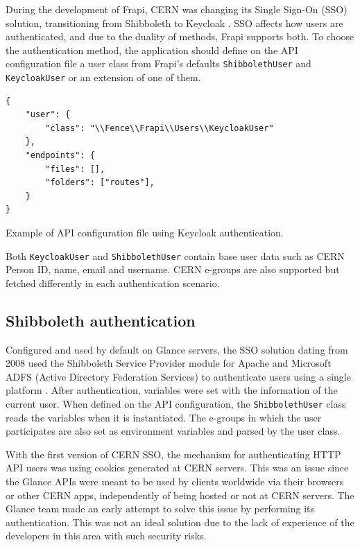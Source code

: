 During the development of Frapi, CERN was changing its Single Sign-On (SSO) solution, transitioning from Shibboleth \cite{shibboleth-website} to Keycloak \cite{keycloak-website}. SSO affects how users are authenticated, and due to the duality of methods, Frapi supports both. To choose the authentication method, the application should define on the API configuration file a user class from Frapi's defaults \texttt{ShibbolethUser} and \texttt{KeycloakUser} or an extension of one of them.

\begin{listing}[htbp]
\begin{verbatim}
{
    "user": {
        "class": "\\Fence\\Frapi\\Users\\KeycloakUser"
    },
    "endpoints": {
        "files": [],
        "folders": ["routes"],
    }
}
\end{verbatim}
\caption{Example of API configuration file using Keycloak authentication.}
\end{listing}

Both \texttt{KeycloakUser} and \texttt{ShibbolethUser} contain base user data such as CERN Person ID, name, email and username. CERN e-groups are also supported but fetched differently in each authentication scenario.

\subsection{Shibboleth authentication}

Configured and used by default on Glance servers, the SSO solution dating from 2008 used the Shibboleth Service Provider module for Apache and Microsoft ADFS (Active Directory Federation Services) to authenticate users using a single platform \cite{shibboleth-article}. After authentication, variables were set with the information of the current user. When defined on the API configuration, the \texttt{ShibbolethUser} class reads the variables when it is instantiated. The e-groups in which the user participates are also set as environment variables and parsed by the user class.

With the first version of CERN SSO, the mechanism for authenticating HTTP API users was using cookies generated at CERN servers. This was an issue since the Glance APIs were meant to be used by clients worldwide via their browsers or other CERN apps, independently of being hosted or not at CERN servers. The Glance team made an early attempt to solve this issue by performing its authentication. This was not an ideal solution due to the lack of experience of the developers in this area with such security risks.

